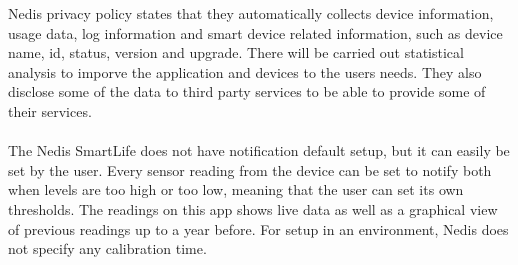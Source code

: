 Nedis privacy policy states that they automatically collects device information, usage data, log information and smart device related information, such as device name, id, status, version and upgrade. There will be carried out statistical analysis to imporve the application and devices to the users needs. They also disclose some of the data to third party services to be able to provide some of their services. 
\\\\
The Nedis SmartLife does not have notification default setup, but it can easily be set by the user. Every sensor reading from the device can be set to notify both when levels are too high or too low, meaning that the user can set its own thresholds. The readings on this app shows live data as well as a graphical view of previous readings up to a year before. For setup in an environment, Nedis does not specify any calibration time.  

